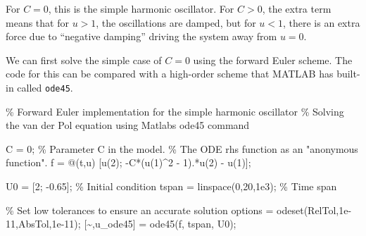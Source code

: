 \documentclass[
  letterpaper,
  DIV=11,
  numbers=noendperiod]{scrreprt}
\newenvironment{Shaded}{\begin{snugshade}}{\end{snugshade}}
\newcommand{\CommentTok}[1]{\textcolor[rgb]{0.37,0.37,0.37}{#1}}
\newcommand{\FloatTok}[1]{\textcolor[rgb]{0.68,0.00,0.00}{#1}}
\newcommand{\NormalTok}[1]{\textcolor[rgb]{0.00,0.23,0.31}{#1}}
\newcommand{\OperatorTok}[1]{\textcolor[rgb]{0.37,0.37,0.37}{#1}}
\newcommand{\SpecialStringTok}[1]{\textcolor[rgb]{0.13,0.47,0.30}{#1}}
\newcommand{\VariableTok}[1]{\textcolor[rgb]{0.07,0.07,0.07}{#1}}
\begin{document}
For \(C=0\), this is the simple harmonic oscillator. For \(C>0\), the
extra term means that for \(u>1\), the oscillations are damped, but for
\(u<1\), there is an extra force due to ``negative damping'' driving the
system away from \(u=0\).

We can first solve the simple case of \(C=0\) using the forward Euler
scheme. The code for this can be compared with a high-order scheme that
MATLAB has built-in called \texttt{ode45}.

\begin{Shaded}
\begin{Highlighting}[]
\CommentTok{\% Forward Euler implementation for the simple harmonic oscillator}
\CommentTok{\% Solving the van der Pol equation using Matlab\textquotesingle{}s ode45 command}

\VariableTok{C} \OperatorTok{=} \FloatTok{0}\OperatorTok{;} \CommentTok{\% Parameter C in the model.}
\CommentTok{\% The ODE rhs function as an "anonymous function".}
\VariableTok{f} \OperatorTok{=} \OperatorTok{@}\NormalTok{(}\VariableTok{t}\OperatorTok{,}\VariableTok{u}\NormalTok{)  [}\VariableTok{u}\NormalTok{(}\FloatTok{2}\NormalTok{)}\OperatorTok{;} \OperatorTok{{-}}\VariableTok{C}\OperatorTok{*}\NormalTok{(}\VariableTok{u}\NormalTok{(}\FloatTok{1}\NormalTok{)}\OperatorTok{\^{}}\FloatTok{2} \OperatorTok{{-}} \FloatTok{1}\NormalTok{)}\OperatorTok{.*}\VariableTok{u}\NormalTok{(}\FloatTok{2}\NormalTok{) }\OperatorTok{{-}} \VariableTok{u}\NormalTok{(}\FloatTok{1}\NormalTok{)]}\OperatorTok{;}

\VariableTok{U0} \OperatorTok{=}\NormalTok{ [}\FloatTok{2}\OperatorTok{;} \OperatorTok{{-}}\FloatTok{0.65}\NormalTok{]}\OperatorTok{;}  \CommentTok{\% Initial condition}
\VariableTok{tspan} \OperatorTok{=} \VariableTok{linspace}\NormalTok{(}\FloatTok{0}\OperatorTok{,}\FloatTok{20}\OperatorTok{,}\FloatTok{1e3}\NormalTok{)}\OperatorTok{;} \CommentTok{\% Time span}

\CommentTok{\% Set low tolerances to ensure an accurate solution}
\VariableTok{options} \OperatorTok{=} \VariableTok{odeset}\NormalTok{(}\SpecialStringTok{\textquotesingle{}RelTol\textquotesingle{}}\OperatorTok{,}\FloatTok{1e{-}11}\OperatorTok{,}\SpecialStringTok{\textquotesingle{}AbsTol\textquotesingle{}}\OperatorTok{,}\FloatTok{1e{-}11}\NormalTok{)}\OperatorTok{;} 
\NormalTok{[}\OperatorTok{\textasciitilde{},}\VariableTok{u\_ode45}\NormalTok{] }\OperatorTok{=} \VariableTok{ode45}\NormalTok{(}\VariableTok{f}\OperatorTok{,} \VariableTok{tspan}\OperatorTok{,} \VariableTok{U0}\NormalTok{)}\OperatorTok{;}


\end{Highlighting}
\end{Shaded}
\end{document}
